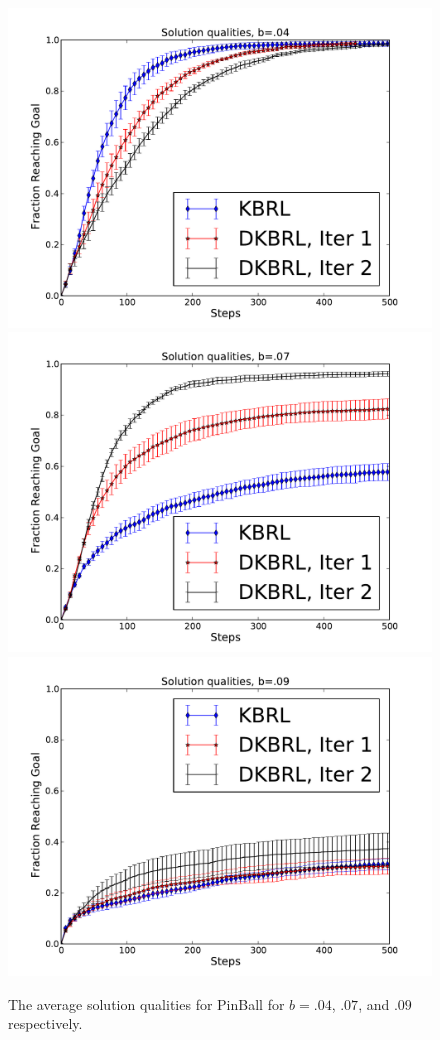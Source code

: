 \documentclass{article} %
\begin{document}
\begin{figure}[!htb]
    \includegraphics[width=\linewidth]{./figs/pb4.pdf}
  \endminipage
    \includegraphics[width=\linewidth]{./figs/pb7.pdf}
  \endminipage
    \includegraphics[width=\linewidth]{./figs/pb9.pdf}
  \endminipage
\caption{The average solution qualities for PinBall for $b=.04$, $.07$, and $.09$ respectively.}
\label{PbFig}
\end{figure}
\end{document}
